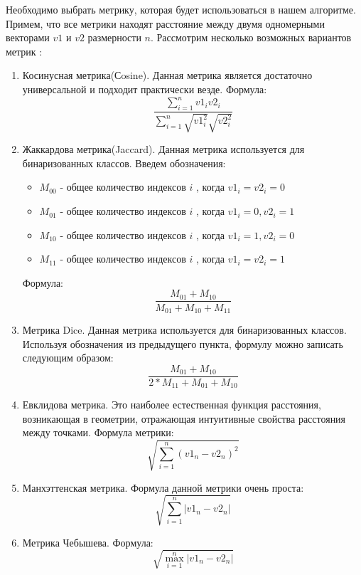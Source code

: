 \documentclass[14pt]{mmcs_article}
\begin{document}
Необходимо выбрать метрику, которая будет использоваться в нашем алгоритме. Примем, что все метрики находят расстояние между двумя одномерными векторами $v1$ и $v2$ размерности $n$.  Рассмотрим несколько возможных вариантов метрик :
\begin{enumerate}
	\item Косинусная метрика(Сosine). Данная метрика является достаточно универсальной и подходит практически везде. Формула: \begin{equation}
		\frac{\sum_{i=1}^n v1_i v2_i}{\sum_{i=1}^n \sqrt{v1_i^2}\sqrt{v2_i^2}}
	\end{equation} 
	\item Жаккардова метрика(Jaccard). Данная метрика используется для бинаризованных классов. Введем обозначения: 
	\begin{itemize}
		\item $M_{00}$ - общее количество индексов $i$ , когда $v1_i = v2_i = 0$
		\item $M_{01}$ - общее количество индексов $i$ , когда $v1_i = 0,  v2_i = 1$
		\item $M_{10}$ - общее количество индексов $i$ , когда $v1_i = 1, v2_i = 0$
		\item $M_{11}$ - общее количество индексов $i$ , когда $v1_i = v2_i = 1$
	\end{itemize}
	 Формула:
	\begin{equation}
		\frac{M_{01} + M_{10}}{M_{01} + M_{10} + M_{11}}
	\end{equation}
	\item Метрика Dice. Данная метрика используется для бинаризованных классов. Используя обозначения из предыдущего пункта, формулу можно записать следующим образом:
	\begin{equation}
		\frac{M_{01} + M_{10}}{2 * M_{11} + M_{01} + M_{10}}
	\end{equation}
	\item Евклидова метрика. Это наиболее естественная функция расстояния, возникающая в геометрии, отражающая интуитивные свойства расстояния между точками. Формула метрики:
	 \begin{equation}
		\sqrt{\sum_{i=1}^n (v1_n - v2_n)^2 }
	\end{equation} 
	\item Манхэттенская метрика.  Формула данной метрики очень проста: 
	 \begin{equation}
		\sqrt{\sum_{i=1}^n | v1_n - v2_n | }
	\end{equation} 
	\item Метрика Чебышева. Формула:
	 \begin{equation}
		\sqrt{\max_{i=1}^n | v1_n - v2_n | }
	\end{equation} 
\end{enumerate} 
\end{document}
